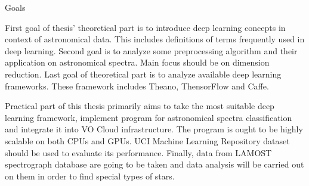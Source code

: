 \chap Goals

First goal of thesis' theoretical part is to introduce deep learning concepts
in context of astronomical data. This includes definitions of terms frequently
used in deep learning.  
Second goal is to analyze some preprocessing algorithm and their application
on astronomical spectra. Main focus should be on dimension reduction.  
Last goal of theoretical part is to analyze available deep learning frameworks.
These framework includes Theano, ThensorFlow and Caffe.

Practical part of this thesis primarily aims to take the most suitable deep
learning framework, implement program for astronomical spectra
classification and integrate it into VO Cloud infrastructure.  
The program is ought to be highly scalable on both CPUs and GPUs. UCI Machine
Learning Repository dataset should be used to evaluate its performance.  
Finally, data from LAMOST spectrograph database are going to be taken
and data analysis will be
carried out on them in order to find special types of stars.
